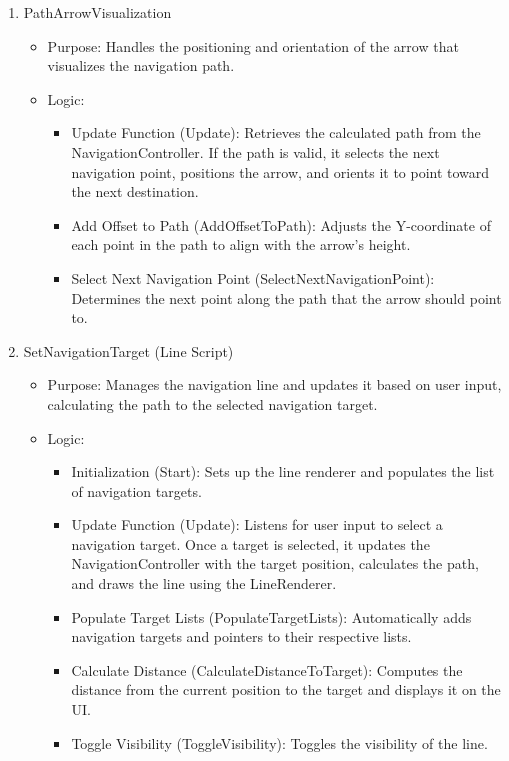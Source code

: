 \documentclass[11pt]{article}
\begin{document}
\begin{multicols}{2}
\begin{enumerate}
	    \item PathArrowVisualization
	    \begin{itemize}
	        \item Purpose: Handles the positioning and orientation of the arrow that visualizes the navigation path.
	        \item Logic:
	        \begin{itemize}
	            \item Update Function (Update): Retrieves the calculated path from the NavigationController. If the path is valid, it selects the next navigation point, positions the arrow, and orients it to point toward the next destination.
	            \item Add Offset to Path (AddOffsetToPath): Adjusts the Y-coordinate of each point in the path to align with the arrow’s height.
	            \item Select Next Navigation Point (SelectNextNavigationPoint): Determines the next point along the path that the arrow should point to.
	        \end{itemize}
	    \end{itemize}
	
	    \item SetNavigationTarget (Line Script)
	    \begin{itemize}
	        \item Purpose: Manages the navigation line and updates it based on user input, calculating the path to the selected navigation target.
	        \item Logic:
	        \begin{itemize}
	            \item Initialization (Start): Sets up the line renderer and populates the list of navigation targets.
	            \item Update Function (Update): Listens for user input to select a navigation target. Once a target is selected, it updates the NavigationController with the target position, calculates the path, and draws the line using the LineRenderer.
	            \item Populate Target Lists (PopulateTargetLists): Automatically adds navigation targets and pointers to their respective lists.
	            \item Calculate Distance (CalculateDistanceToTarget): Computes the distance from the current position to the target and displays it on the UI.
	            \item Toggle Visibility (ToggleVisibility): Toggles the visibility of the line.
	        \end{itemize}
	    \end{itemize}
	\end{enumerate}


\end{multicols}
\end{document}
